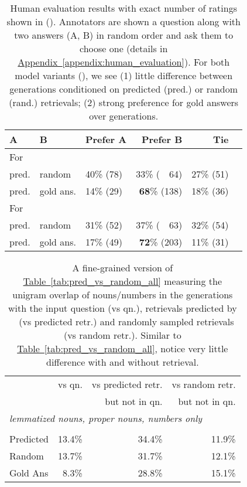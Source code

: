 \documentclass[11pt]{article}
\newcommand{\namedref}[2]{\hyperref[#2]{#1~\ref*{#2}}}
\newcommand{\tableref}[1]{\namedref{Table}{#1}}
\newcommand{\appendixref}[1]{\namedref{Appendix}{#1}}
\newcommand{\retriever}[1]{\textsc{c-REALM}}
\begin{document}
\begin{table}[t]
\small
\begin{center}
\begin{tabular}{ lllrrr } 
 \toprule
A & B &  Prefer A & Prefer B & Tie \\
\midrule
\multicolumn{5}{l}{For }\\
 pred. & random & 40\% (78) & 33\% (~~64) & 27\% (51) \\
 pred. & gold ans. & 14\% (29) & \textbf{68}\% (138) & 18\% (36) \\
 \midrule
\multicolumn{5}{l}{For }\\
  pred. & random & 31\% (52) & 37\% (~~63) & 32\% (54)\\
 pred. & gold ans. & 17\% (49) & \textbf{72}\% (203) & 11\% (31) \\
\bottomrule
\end{tabular}
\end{center}
\caption{Human evaluation results with exact number of ratings shown in (). Annotators are shown a question along with two answers (A, B) in random order and ask them to choose one (details in \appendixref{appendix:human_evaluation}). For both model variants (), we see (1) little difference between generations conditioned on predicted (pred.) or random (rand.) retrievals; (2) strong preference for gold answers over generations. }
\vspace{-0.1in}
\label{tab:human_evaluation}
\end{table}

\begin{table}[t]
\small
\begin{center}
\begin{tabular}{ lrrr } 
 \toprule
  & vs qn. & vs predicted retr. & vs random retr. \\
 & & but not in qn. & but not in qn. \\
\midrule
\multicolumn{4}{l}{\emph{lemmatized nouns, proper nouns, numbers only}} \\\\
Predicted & 13.4\% & 34.4\% & 11.9\% \\
Random & 13.7\% & 31.7\% & 12.1\% \\
\midrule
Gold Ans & 8.3\% & 28.8\% & 15.1\% \\
\bottomrule
\end{tabular}
\end{center}
\caption{A fine-grained version of \tableref{tab:pred_vs_random_all} measuring the unigram overlap of nouns/numbers in the generations with the input question (vs qn.), retrievals predicted by \retriever~ (vs predicted retr.) and randomly sampled retrievals (vs random retr.). Similar to \tableref{tab:pred_vs_random_all}, notice very little difference with and without retrieval.}
\label{tab:pred_vs_random_all_nouns}
\end{table}
\end{document}

